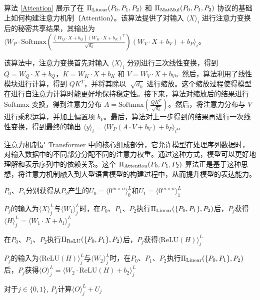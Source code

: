 算法 \ref{Attention} 展示了在 $\Pi_{\rm Linear}({P_0, P_1}, P_2)$ 和 $\Pi_{\rm MatMul}({P_0, P_1}, P_2)$ 协议的基础上如何构建注意力机制（Attention）。该算法提供了对输入 $\langle X\rangle_i$ 进行注意力变换后的秘密共享结果，其输出为 $\langle W_P\cdot \text{Softmax}(\frac{ (W_Q\cdot X + b_Q)(W_K\cdot X + b_K)^T }{\sqrt[]{d_k}})(W_V\cdot X + b_V) + b_P\rangle_i$。

该算法中，注意力变换首先对输入 $\langle X\rangle_i$ 分别进行三次线性变换，得到 $Q=W_Q\cdot X + b_Q$，$K=W_K\cdot X + b_K$ 和 $V=W_V\cdot X + b_V$。然后，算法利用了线性模块进行计算，得到 $QK^T$，并将其除以 $\sqrt[]{d_k}$ 进行缩放。这个缩放过程使得模型在进行自注意力计算时能更好地保持稳定性。接下来，算法对缩放后的结果进行 Softmax 变换，得到注意力分布 $A=\text{Softmax}(\frac{ QK^T }{\sqrt[]{d_k}})$。然后，将注意力分布与 $V$ 进行乘积运算，并加上偏置项 $b_V$。最后，算法对上一步得到的结果再进行一次线性变换，得到最终的输出 $\langle y\rangle_i = \langle W_P(A\cdot V + b_V) + b_P\rangle_i$。

注意力机制是 Transformer 中的核心组成部分，它允许模型在处理序列数据时，对输入数据中的不同部分分配不同的注意力权重。通过这种方式，模型可以更好地理解和表示序列中的依赖关系。这个 $\Pi_{\rm Attention}({P_0, P_1}, P_2)$ 算法正是基于这种思想，将注意力机制融入到大型语言模型的构建过程中，从而提升模型的表达能力。

\begin{algorithm}[H]
	\SetAlgoLined
	
	
	$P_0$、$P_1$分别获得从$P_2$产生的$U_0=\langle 0^{m\times n}\rangle_0^L$和$U_1=\langle 0^{m\times n}\rangle_1^L$
	
	
	
	$P_j$的输入为$\langle X\rangle_j^L$与$\langle W_1\rangle_j^L$时，在$P_0$、$P_1$、$P_2$执行$\Pi_{\rm Linear}(\{P_0, P_1\}, P_2)$后，$P_j$获得$\langle H\rangle_j^L = \langle W_1\cdot X + b_1\rangle_j^L$ 
	
	在$P_0$、$P_1$、$P_2$执行$\Pi_{\rm ReLU}(\{P_0, P_1\}, P_2)$后，$P_j$获得$\langle \text{ReLU}(H)\rangle_j^L$ 
	
	$P_j$的输入为$\langle \text{ReLU}(H)\rangle_j^L$与$\langle W_2\rangle_j^L$时，在$P_0$、$P_1$、$P_2$执行$\Pi_{\rm Linear}(\{P_0, P_1\}, P_2)$后，$P_j$获得$\langle O\rangle_j^L = \langle W_2\cdot \text{ReLU}(H) + b_2 \rangle_j^L$ 
	
	对于$j\in \{0, 1\}$, $P_j$计算$\langle O\rangle_j^L + U_j$
	
	\caption{ $\Pi_{\rm FFN}(\{P_0, P_1\}, P_2)$ }
	\label{FFN}
\end{algorithm}

